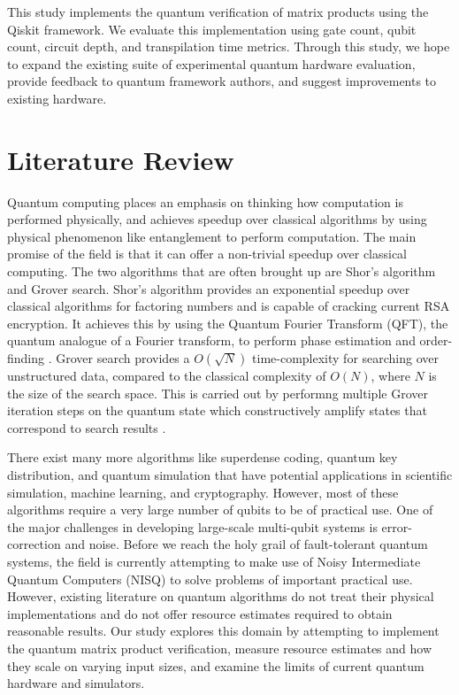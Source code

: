\documentclass[10pt]{proc}
\theoremstyle{definition}
\theoremstyle{remark}
\begin{document}
This study implements the quantum verification of matrix products using the
Qiskit framework. We evaluate this implementation using gate count, qubit
count, circuit depth, and transpilation time metrics. Through this study, we
hope to expand the existing suite of experimental quantum hardware evaluation,
provide feedback to quantum framework authors, and suggest improvements to
existing hardware. 

\section{Literature Review}


Quantum computing places an emphasis on thinking how computation is performed
physically, and achieves speedup over classical algorithms by using physical
phenomenon like entanglement to perform computation. The main promise of the
field is that it can offer a non-trivial speedup over classical computing. The
two algorithms that are often brought up are Shor’s algorithm and Grover
search. Shor’s algorithm provides an exponential speedup over classical
algorithms for factoring numbers and is capable of cracking current RSA
encryption. It achieves this by using the Quantum Fourier Transform (QFT), the
quantum analogue of a Fourier transform, to perform phase estimation and
order-finding \cite{nielsen_quantum_2000}.  Grover search provides a
$O(\sqrt{N})$ time-complexity for searching over unstructured data, compared to
the classical complexity of $O(N)$, where $N$ is the size of the search space.
This is carried out by performng multiple Grover iteration steps on the quantum
state which constructively amplify states that correspond to search results
\cite{nielsen_quantum_2000}. 

There exist many more algorithms like superdense coding, quantum key
distribution, and quantum simulation that have potential applications in
scientific simulation, machine learning, and cryptography. However, most of
these algorithms require a very large number of qubits to be of practical use.
One of the major challenges in developing large-scale multi-qubit systems is
error-correction and noise. Before we reach the holy grail of  fault-tolerant
quantum systems, the field is currently attempting to make use of Noisy
Intermediate Quantum Computers (NISQ) to solve problems of important practical
use. However, existing literature on quantum algorithms do not treat their
physical implementations and do not offer resource estimates required to obtain
reasonable results. Our study explores this domain by attempting to
implement the quantum matrix product verification, measure resource estimates
and how they scale on varying input sizes, and examine the limits of current
quantum hardware and simulators.
\end{document}
